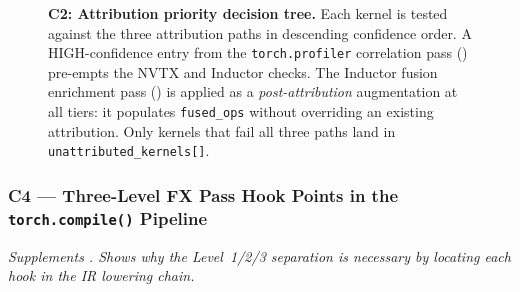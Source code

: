 \begin{figure}[H]
\caption{\textbf{C2: Attribution priority decision tree.}
  Each kernel is tested against the three attribution paths in descending confidence
  order.  A HIGH-confidence entry from the \texttt{torch.profiler} correlation pass
  () pre-empts the NVTX and Inductor checks.  The Inductor
  fusion enrichment pass () is applied as a \emph{post-attribution}
  augmentation at all tiers: it populates \texttt{fused\_ops} without overriding
  an existing attribution.  Only kernels that fail all three paths land in
  \texttt{unattributed\_kernels[]}.}
\label{fig:cand:decisiontree}
\end{figure}


\subsubsection*{C4 --- Three-Level FX Pass Hook Points in the \texttt{torch.compile()} Pipeline}
\noindent\textit{Supplements .  Shows \emph{why} the Level~1/2/3
  separation is necessary by locating each hook in the IR lowering chain.}

